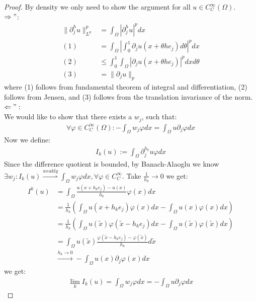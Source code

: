 \documentclass[a4paper,11pt,oneside,fleqn]{book}
\theoremstyle{definition}
\theoremstyle{remark}
\begin{document}
\begin{proof}
	By density we only need to show the argument for all $u \in C^\infty_C(\Omega)$.\\
	$\Rightarrow"$: 
	\begin{align*}
		\|\partial_j^h u \|_{L^p}^p &= \int_\Omega |\partial_j^h u|^p dx \\
		(1)&= \int_\Omega | \int_0^1 \partial_j u(x + \theta h e_j)d\theta|^p dx\\
		(2)&\leq \int_0^1\int_\Omega |\partial_j u(x + \theta h e_j)|^p dx d\theta\\
		(3)&= \|\partial_j u\|_p
	\end{align*}
	where (1) follows from fundamental theorem of integral and differentiation, (2) follows from Jensen, and (3) follows from the translation invariance of the norm.\\
	$\Leftarrow":$\\
	We would like to show that there exists a $w_j$, such that:
	\begin{align*}
		\forall \varphi \in C^\infty_C(\Omega): -\int_\Omega w_j \varphi dx = \int_\Omega u \partial_j \varphi dx
	\end{align*}
	Now we define:
	\begin{align*}
		I_k(u) := \int_\Omega \partial_j^{h_k} u \varphi dx
	\end{align*}
	Since the difference quotient is bounded, by Banach-Alaoglu we know $\exists w_j: I_k(u) \overset{weakly}{\rightharpoonup} \int_\Omega w_j \varphi dx,  \forall \varphi \in C_C^\infty$. Take $\frac{1}{h_k} \rightarrow 0$ we get:
	\begin{align*}
		I^k(u) &= \int_\Omega \frac{u(x + h_ke_j) - u(x)}{h_k} \varphi(x) dx \\
		&= \frac{1}{h_k} (\int_\Omega u(x + h_k e_j)\varphi(x)dx - \int_\Omega u(x) \varphi(x)dx)\\
		&= \frac{1}{h_k}(\int_\Omega u(\tilde{x}) \varphi(\tilde{x} - h_k e_j)dx - \int_\Omega u(\tilde{x})\varphi(\tilde{x})dx)\\
		&=  \int_\Omega u(\tilde{x}) \frac{\varphi(\tilde{x} - h_k e_j) - \varphi(\tilde{x})}{h_k} d\tilde{x}    \\
		&\overset{h_k \rightarrow 0}{\rightarrow} -\int_\Omega u(x) \partial_j \varphi(x)dx 
	\end{align*}
	we get:
	\begin{align*}
		\lim_k I_k(u) = \int_\Omega w_j \varphi dx = -\int_\Omega u \partial_j \varphi dx 
	\end{align*} 
\end{proof}
\end{document}
